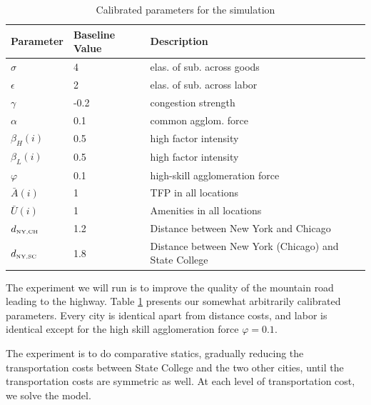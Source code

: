 \documentclass[12 pt]{article}
\begin{document}
\begin{table}
\centering
\begin{tabular}{lll}
\hline \hline
Parameter               & Baseline Value & Description                                           \\ \hline
$\sigma$                & 4              & elas. of sub. across goods                            \\
$\epsilon$              & 2              & elas. of sub. across labor                            \\
$\gamma$                & -0.2           & congestion strength                                   \\
$\alpha$                & 0.1            & common agglom. force                                  \\
$\beta_H(i)$            & 0.5            & high factor intensity                                 \\
$\beta_L(i)$            & 0.5            & high factor intensity                                 \\
$\varphi$               & 0.1            & high-skill agglomeration force                        \\
$\bar{A}(i)$            & 1              & TFP in all locations                                  \\
$\bar{U}(i)$            & 1              & Amenities in all locations                            \\
$d_{\tiny \mbox{NY,CH}}$ & 1.2            & Distance between New York and Chicago                 \\
$d_{\tiny \mbox{NY,SC}}$ & 1.8            & Distance between New York (Chicago) and State College \\
\hline
\end{tabular}
\caption{Calibrated parameters for the simulation}
\label{tab:cal_par}
\end{table}

The experiment we will run is to improve the quality of the mountain road leading to the highway.  Table \ref{tab:cal_par} presents our somewhat arbitrarily calibrated parameters.  Every city is identical apart from distance costs, and labor is identical except for the high skill agglomeration force $\varphi = 0.1$.

The experiment is to do comparative statics, gradually reducing the transportation costs between State College and the two other cities, until the transportation costs are symmetric as well.  At each level of transportation cost, we solve the model.
\end{document}
